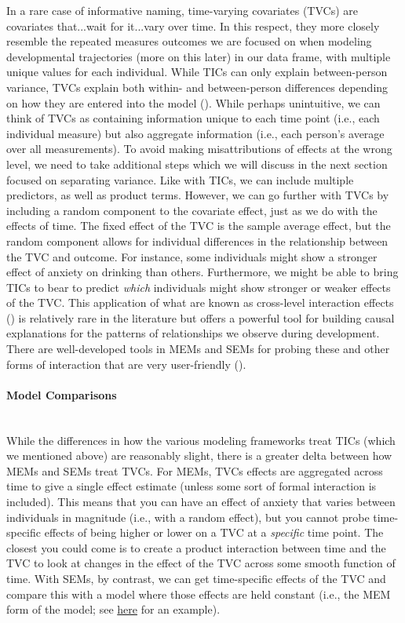 \documentclass[11pt]{article}
\newcommand{\subsubsubsection}[1]{\paragraph{#1}\mbox{}\\}  %
\begin{document}
In a rare case of informative naming, time-varying covariates (TVCs) are covariates that...wait for it...vary over time. In this respect, they more closely resemble the repeated measures outcomes we are focused on when modeling developmental trajectories (more on this later) in our data frame, with multiple unique values for each individual. While TICs can only explain between-person variance, TVCs explain both within- and between-person differences depending on how they are entered into the model (\cite{curran_disaggregation_2011}). While perhaps unintuitive, we can think of TVCs as containing information unique to each time point (i.e., each individual measure) but also aggregate information (i.e., each person’s average over all measurements). To avoid making misattributions of effects at the wrong level, we need to take additional steps which we will discuss in the next section focused on separating variance. Like with TICs, we can include multiple predictors, as well as product terms. However, we can go further with TVCs by including a random component to the covariate effect, just as we do with the effects of time. The fixed effect of the TVC is the sample average effect, but the random component allows for individual differences in the relationship between the TVC and outcome. For instance, some individuals might show a stronger effect of anxiety on drinking than others. Furthermore, we might be able to bring TICs to bear to predict \textit{which} individuals might show stronger or weaker effects of the TVC. This application of what are known as cross-level interaction effects (\cite{bauer_conceptualizing_2006,bauer_probing_2005,curran_testing_2004}) is relatively rare in the literature but offers a powerful tool for building causal explanations for the patterns of relationships we observe during development. There are well-developed tools in MEMs and SEMs for probing these and other forms of interaction that are very user-friendly (\cite{preacher_computational_2006}).

\subsubsubsection{Model Comparisons}
While the differences in how the various modeling frameworks treat TICs (which we mentioned above) are reasonably slight, there is a greater delta between how MEMs and SEMs treat TVCs. For MEMs, TVCs effects are aggregated across time to give a single effect estimate (unless some sort of formal interaction is included). This means that you can have an effect of anxiety that varies between individuals in magnitude (i.e., with a random effect), but you cannot probe time-specific effects of being higher or lower on a TVC at a \textit{specific} time point. The closest you could come is to create a product interaction between time and the TVC to look at changes in the effect of the TVC across some smooth function of time. With SEMs, by contrast, we can get time-specific effects of the TVC and compare this with a model where those effects are held constant (i.e., the MEM form of the model; see \href{https://e-m-mccormick.github.io/static/longitudinal-primer/05-covariates.html#time-varying-covariates}{here} for an example).
\end{document}
